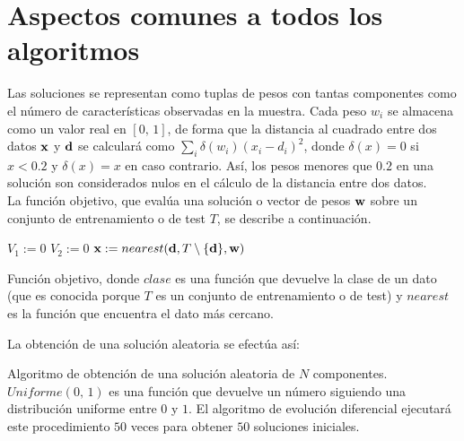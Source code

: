 \documentclass{article}
\newenvironment{algo}{
	\vspace*{0.5cm}
	\begin{algorithm}[H]}{
	\end{algorithm}
	\vspace*{0.5cm}
}
\begin{document}


\section{Aspectos comunes a todos los algoritmos}

Las soluciones se representan como tuplas de pesos con tantas componentes como el número de características observadas en la muestra. Cada peso $w_i$ se almacena como un valor real en $[0,\,1]$, de forma que la distancia al cuadrado entre dos datos $\normalfont \textbf x$ y $\normalfont \textbf d$ se calculará como $\sum_i \delta(w_i)(x_i - d_i)^2$, donde $\delta(x) = 0$ si $x < 0.2$ y $\delta(x) = x$ en caso contrario. Así, los pesos menores que $0.2$ en una solución son considerados nulos en el cálculo de la distancia entre dos datos. \\

La función objetivo, que evalúa una solución o vector de pesos $\textbf w$ sobre un conjunto de entrenamiento o de test $T$, se describe a continuación.

\begin{algo}
	\BlankLine
	
	$V_1 := 0$\;
	$V_2 := 0$\;
	 {
		$\normalfont \textbf x := nearest(\normalfont \textbf d, T \setminus \{ \normalfont \textbf d \}, \normalfont \textbf w)$\;
	}
	 {
	}
	\vspace{0.2cm}
	\caption{Función objetivo, donde $clase$ es una función que devuelve la clase de un dato (que es conocida porque $T$ es un conjunto de entrenamiento o de test) y \hyperref[nn]{$nearest$} es la función que encuentra el dato más cercano.}
\end{algo}

La obtención de una solución aleatoria se efectúa así:

\begin{algo}
	\label{random}
	\BlankLine

	\vspace{0.2cm}
	\caption{Algoritmo de obtención de una solución aleatoria de $N$ componentes. $Uniforme(0,\, 1)$ es una función que devuelve un número siguiendo una distribución uniforme entre $0$ y $1$. El algoritmo de evolución diferencial ejecutará este procedimiento $50$ veces para obtener $50$ soluciones iniciales.}
\end{algo}
\end{document}
